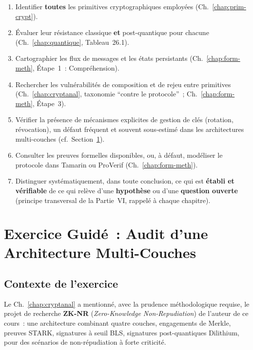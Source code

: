 \begin{enumerate}
    \item[$\square$] Identifier \textbf{toutes} les primitives
          cryptographiques employées (Ch.~\ref{chap:prim-crypt}).
    \item[$\square$] Évaluer leur résistance classique \textbf{et}
          post-quantique pour chacune (Ch.~\ref{chap:quantique},
          Tableau~26.1).
    \item[$\square$] Cartographier les flux de messages et les
          états persistants (Ch.~\ref{chap:form-meth},
          Étape~1~: Compréhension).
    \item[$\square$] Rechercher les vulnérabilités de composition
          et de rejeu entre primitives (Ch.~\ref{chap:cryptanal},
          taxonomie ``contre le protocole''~; Ch.~\ref{chap:form-meth},
          Étape~3).
    \item[$\square$] Vérifier la présence de mécanismes explicites
          de gestion de clés (rotation, révocation), un défaut
          fréquent et souvent sous-estimé dans les architectures
          multi-couches (cf.~Section~\ref{sec:exercice-guide}).
    \item[$\square$] Consulter les preuves formelles disponibles,
          ou, à défaut, modéliser le protocole dans Tamarin ou
          ProVerif (Ch.~\ref{chap:form-meth}).
    \item[$\square$] Distinguer systématiquement, dans toute
          conclusion, ce qui est \textbf{établi et vérifiable}
          de ce qui relève d'une \textbf{hypothèse} ou d'une
          \textbf{question ouverte} (principe transversal de
          la Partie~VI, rappelé à chaque chapitre).
\end{enumerate}

\section{Exercice Guidé~: Audit d'une Architecture Multi-Couches}
\label{sec:exercice-guide}

\subsection{Contexte de l'exercice}

Le Ch.~\ref{chap:cryptanal} a mentionné, avec la prudence
méthodologique requise, le projet de recherche \textbf{ZK-NR}
(\textit{Zero-Knowledge Non-Repudiation}) de l'auteur de ce cours~:
une architecture combinant quatre couches, engagements de
Merkle, preuves STARK, signatures à seuil BLS, signatures
post-quantiques Dilithium, pour des scénarios de non-répudiation
à forte criticité.

